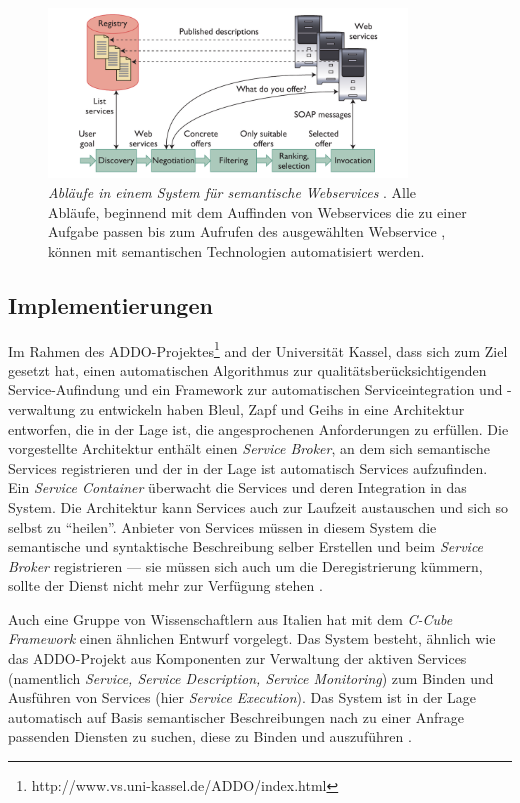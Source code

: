 \begin{figure}[ht]
\centering
\parbox{0.85\textwidth}{
    \includegraphics[width=0.85\textwidth]{media/semantic-ws-client-system.png}
    \caption{\emph{Abläufe in einem System für semantische Webservices} \cite[S.64]{ky-sawsdl}. Alle Abläufe, beginnend mit dem Auffinden von Webservices die zu einer Aufgabe passen bis zum Aufrufen des ausgewählten Webservice , können mit semantischen Technologien automatisiert werden.}
    \label{f:swcs}
}
\end{figure}

\subsection{Implementierungen}

Im Rahmen des \ac{ADDO}-Projektes\footnote{http://www.vs.uni-kassel.de/ADDO/index.html} and der Universität Kassel, dass sich zum Ziel gesetzt hat, einen automatischen Algorithmus zur qualitätsberücksichtigenden Service-Aufindung und ein Framework zur automatischen Serviceintegration und -verwaltung zu entwickeln haben Bleul, Zapf und Geihs in \cite[S.410ff]{flexbrok} eine Architektur entworfen, die in der Lage ist, die angesprochenen Anforderungen zu erfüllen. Die vorgestellte Architektur enthält einen \emph{Service Broker}, an dem sich semantische Services registrieren und der in der Lage ist automatisch Services aufzufinden. Ein \emph{Service Container} überwacht die Services und deren Integration in das System. Die Architektur kann Services auch zur Laufzeit austauschen und sich so selbst zu "`heilen"'. Anbieter von Services müssen in diesem System die semantische und syntaktische Beschreibung selber Erstellen und beim \emph{Service Broker} registrieren --- sie müssen sich auch um die Deregistrierung kümmern, sollte der Dienst nicht mehr zur Verfügung stehen \cite[S.416]{flexbrok}.

Auch eine Gruppe von Wissenschaftlern aus Italien hat mit dem \emph{C-Cube Framework}\cite{ccube} einen ähnlichen Entwurf vorgelegt. Das System besteht, ähnlich wie das \ac{ADDO}-Projekt aus Komponenten zur Verwaltung der aktiven Services (namentlich \emph{Service, Service Description, Service Monitoring}) zum Binden und Ausführen von Services (hier \emph{Service Execution}). Das System ist in der Lage automatisch auf Basis semantischer Beschreibungen nach zu einer Anfrage passenden Diensten zu suchen, diese zu Binden und auszuführen \cite[S.4]{ccube}.

